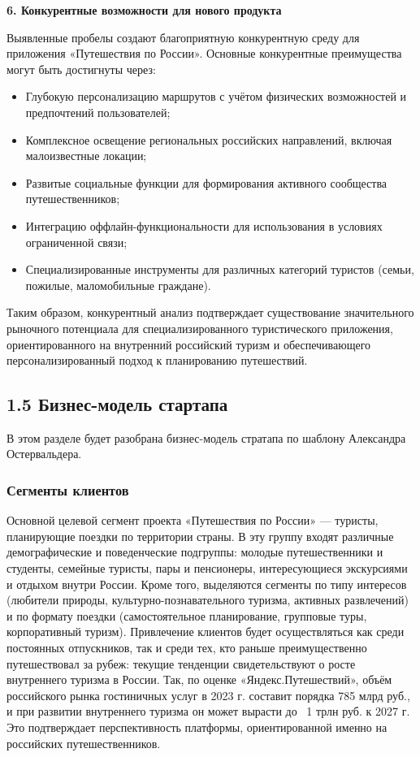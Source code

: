 \textbf{6. Конкурентные возможности для нового продукта}

Выявленные пробелы создают благоприятную конкурентную среду для приложения «Путешествия по России». Основные конкурентные преимущества могут быть достигнуты через:
\begin{itemize}
    \item Глубокую персонализацию маршрутов с учётом физических возможностей и предпочтений пользователей;
    \item Комплексное освещение региональных российских направлений, включая малоизвестные локации;
    \item Развитые социальные функции для формирования активного сообщества путешественников;
    \item Интеграцию оффлайн-функциональности для использования в условиях ограниченной связи;
    \item Специализированные инструменты для различных категорий туристов (семьи, пожилые, маломобильные граждане).
\end{itemize}

\noindent Таким образом, конкурентный анализ подтверждает существование значительного рыночного потенциала для специализированного туристического приложения, ориентированного на внутренний российский туризм и обеспечивающего персонализированный подход к планированию путешествий.

\subsection*{1.5 Бизнес-модель стартапа}
В этом разделе будет разобрана бизнес-модель стратапа по шаблону Александра Остервальдера.

\subsubsection*{Сегменты клиентов}
Основной целевой сегмент проекта «Путешествия по России» — туристы, планирующие поездки по территории страны. В эту группу входят различные демографические и поведенческие подгруппы: молодые путешественники и студенты, семейные туристы, пары и пенсионеры, интересующиеся экскурсиями и отдыхом внутри России. Кроме того, выделяются сегменты по типу интересов (любители природы, культурно-познавательного туризма, активных развлечений) и по формату поездки (самостоятельное планирование, групповые туры, корпоративный туризм). Привлечение клиентов будет осуществляться как среди постоянных отпускников, так и среди тех, кто раньше преимущественно путешествовал за рубеж: текущие тенденции свидетельствуют о росте внутреннего туризма в России. Так, по оценке «Яндекс.Путешествий», объём российского рынка гостиничных услуг в 2023 г. составит порядка 785 млрд руб., и при развитии внутреннего туризма он может вырасти до ~1 трлн руб. к 2027 г. Это подтверждает перспективность платформы, ориентированной именно на российских путешественников.

